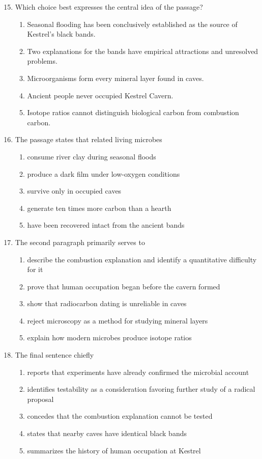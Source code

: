 \begin{enumerate}\setcounter{enumi}{14}
\item Which choice best expresses the central idea of the passage?
\begin{enumerate}
\item Seasonal flooding has been conclusively established as the source of Kestrel's black bands.
\item Two explanations for the bands have empirical attractions and unresolved problems.
\item Microorganisms form every mineral layer found in caves.
\item Ancient people never occupied Kestrel Cavern.
\item Isotope ratios cannot distinguish biological carbon from combustion carbon.
\end{enumerate}

\item The passage states that related living microbes
\begin{enumerate}
\item consume river clay during seasonal floods
\item produce a dark film under low-oxygen conditions
\item survive only in occupied caves
\item generate ten times more carbon than a hearth
\item have been recovered intact from the ancient bands
\end{enumerate}

\item The second paragraph primarily serves to
\begin{enumerate}
\item describe the combustion explanation and identify a quantitative difficulty for it
\item prove that human occupation began before the cavern formed
\item show that radiocarbon dating is unreliable in caves
\item reject microscopy as a method for studying mineral layers
\item explain how modern microbes produce isotope ratios
\end{enumerate}

\item The final sentence chiefly
\begin{enumerate}
\item reports that experiments have already confirmed the microbial account
\item identifies testability as a consideration favoring further study of a radical proposal
\item concedes that the combustion explanation cannot be tested
\item states that nearby caves have identical black bands
\item summarizes the history of human occupation at Kestrel
\end{enumerate}


\end{enumerate}
